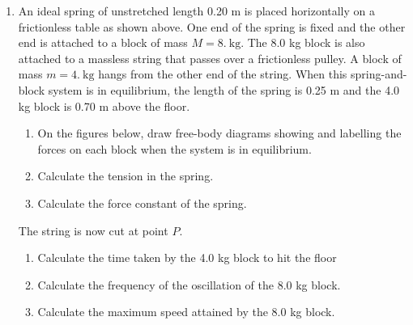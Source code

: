 \documentclass{../../../oss-apphys}
\begin{document}
\begin{enumerate}[leftmargin=15pt]
\item An ideal spring of unstretched length 0.20 m is placed horizontally on a
  frictionless table as shown above. One end of the spring is fixed and the
  other end is attached to a block of mass $M=\SI{8.}{\kilo\gram}$. The 8.0 kg
  block is also attached to a massless string that passes over a frictionless
  pulley. A block of mass $m=\SI{4.}{\kilo\gram}$ hangs from the other end of
  the string. When this spring-and-block system is in equilibrium, the length
  of the spring is 0.25 m and the 4.0 kg block is 0.70 m above the floor.
  \begin{enumerate}[leftmargin=18pt,topsep=0pt,noitemsep]
  \item On the figures below, draw free-body diagrams showing and labelling
    the forces on each block when the system is in equilibrium.
    \begin{center}
      \hspace{2in}
    \end{center}
    \vspace{.5in}
  \item Calculate the tension in the spring.
  \item Calculate the force constant of the spring.
  \end{enumerate}
  The string is now cut at point $P$.
  \begin{enumerate}[leftmargin=18pt,topsep=0pt,noitemsep,resume]
  \item Calculate the time taken by the 4.0 kg block to hit the floor
  \item Calculate the frequency of the oscillation of the 8.0 kg block.
  \item Calculate the maximum speed attained by the 8.0 kg block.
  \end{enumerate}
  \newpage


\end{enumerate}
\end{document}
